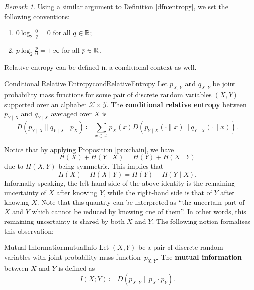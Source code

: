 \documentclass[math, code]{amznotes}
\theoremstyle{remark}
\newtheorem*{remark}{Remark}
\begin{document}
\begin{notebox}
    \begin{remark}
        Using a similar argument to Definition \ref{dfn:entropy}, we set the following conventions:
        \begin{enumerate}
            \item $0\log_2\frac{0}{q} = 0$ for all $q \in \mathbb{R}$;
            \item $p\log_2\frac{p}{0} = +\infty$ for all $p \in \mathbb{R}$.
        \end{enumerate}
    \end{remark}
\end{notebox}
Relative entropy can be defined in a conditional context as well.
\begin{dfnbox}{Conditional Relative Entropy}{condRelativeEntropy}
    Let $p_{X, Y}$ and $q_{X, Y}$ be joint probability mass functions for some pair of discrete random variables $\left(X, Y\right)$ supported over an alphabet $\mathcal{X} \times \mathcal{Y}$. The {\color{red} \textbf{conditional relative entropy}} between $p_{Y \mid X}$ and $q_{Y \mid X}$ averaged over $X$ is 
    \begin{equation*}
        D\left(p_{Y \mid X} \parallel q_{Y \mid X} \mid p_X\right) \coloneqq \sum_{x \in \mathcal{X}}p_X\left(x\right)D\left(p_{Y \mid X}\left(\cdot \parallel x\right) \parallel q_{Y \mid X}\left(\cdot \parallel x\right)\right).
    \end{equation*}
\end{dfnbox}
Notice that by applying Proposition \ref{pro:chain}, we have 
\begin{equation*}
    H\left(X\right) + H\left(Y \mid X\right) = H\left(Y\right) + H\left(X \mid Y\right)
\end{equation*}
due to $H\left(X, Y\right)$ being symmetric. This implies that 
\begin{equation*}
    H\left(X\right) - H\left(X \mid Y\right) = H\left(Y\right) - H\left(Y \mid X\right).
\end{equation*}
Informally speaking, the left-hand side of the above identity is the remaining uncertainty of $X$ after knowing $Y$, while the right-hand side is that of $Y$ after knowing $X$. Note that this quantity can be interpreted as ``the uncertain part of $X$ and $Y$ which cannot be reduced by knowing one of them''. In other words, this remaining uncertainty is shared by both $X$ and $Y$. The following notion formalises this observation:
\begin{dfnbox}{Mutual Information}{mutualInfo}
    Let $\left(X, Y\right)$ be a pair of discrete random variables with joint probability mass function~$p_{X, Y}$. The {\color{red} \textbf{mutual information}} between $X$ and $Y$ is defined as 
    \begin{equation*}
        I\left(X ; Y\right) \coloneqq D\left(p_{X, Y} \parallel p_X \cdot p_Y\right).
    \end{equation*}
\end{dfnbox}
\end{document}
